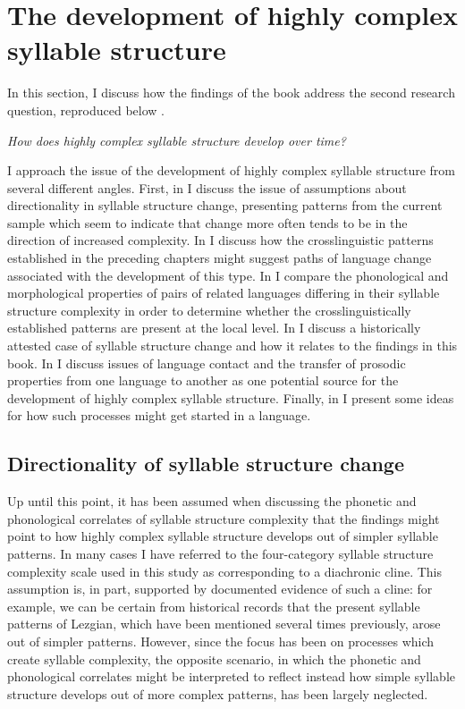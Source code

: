 \section{The development of highly complex syllable structure}\label{sec:8.4}

  In this section, I discuss how the findings of the book address the second research question, reproduced below .

\ea\label{ex:8.2}
   \textit{How does highly complex syllable structure develop over time?}
\z

  I approach the issue of the development of highly complex syllable structure from several different angles. First, in  I discuss the issue of assumptions about directionality in syllable structure change, presenting patterns from the current sample which seem to indicate that change more often tends to be in the direction of increased complexity. In  I discuss how the crosslinguistic patterns established in the preceding chapters might suggest paths of language change associated with the development of this type. In  I compare the phonological and morphological properties of pairs of related languages differing in their syllable structure complexity in order to determine whether the crosslinguistically established patterns are present at the local level. In  I discuss a historically attested case of syllable structure change and how it relates to the findings in this book. In  I discuss issues of language contact and the transfer of prosodic properties from one language to another as one potential source for the development of highly complex syllable structure. Finally, in  I present some ideas for how such processes might get started in a language.

\subsection{Directionality of syllable structure change}\label{sec:8.4.1}

  Up until this point, it has been assumed when discussing the phonetic and phonological correlates of syllable structure complexity that the findings might point to how highly complex syllable structure develops out of simpler syllable patterns. In many cases I have referred to the four-category syllable structure complexity scale used in this study as corresponding to a diachronic cline. This assumption is, in part, supported by documented evidence of such a cline: for example, we can be certain from historical records that the present syllable patterns of Lezgian, which have been mentioned several times previously, arose out of simpler patterns. However, since the focus has been on processes which create syllable complexity, the opposite scenario, in which the phonetic and phonological correlates might be interpreted to reflect instead how simple syllable structure develops out of more complex patterns, has been largely neglected.

